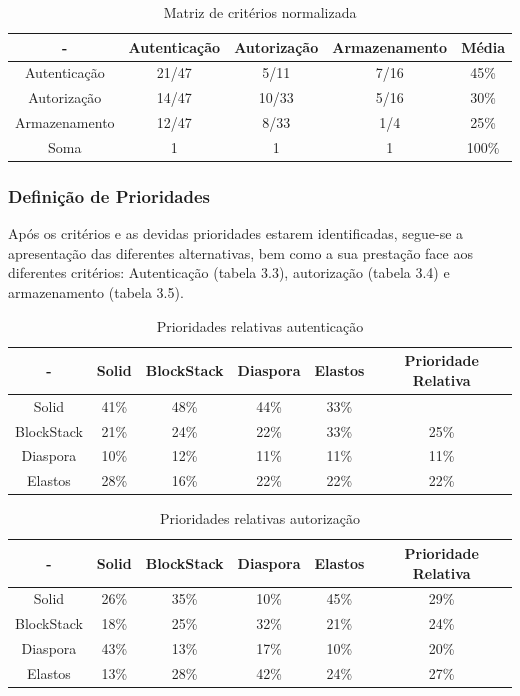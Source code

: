 \begin{table}[h]
\centering
\caption{Matriz de critérios normalizada}
\label{table_matriz_criterios_normalizada}
\vspace{0.5cm}
\begin{tabular}{c|c|c|c|c}
\centering
 - & Autenticação & Autorização & Armazenamento & Média \\
\hline                               
Autenticação & 21/47 & 5/11 & 7/16 & 45\% \\
Autorização &  14/47 & 10/33 & 5/16 & 30\% \\
Armazenamento &  12/47 &  8/33 & 1/4 & 25\% \\
Soma & 1 & 1 & 1 & 100\% \\
\end{tabular}
\end{table}

\pagebreak

\subsubsection{Definição de Prioridades}
Após os critérios e as devidas prioridades estarem identificadas, segue-se a apresentação das diferentes alternativas, bem como a sua prestação face aos diferentes critérios: Autenticação (tabela 3.3), autorização (tabela 3.4) e armazenamento (tabela 3.5). 

\begin{table}[H]
\centering
\caption{Prioridades relativas autenticação}
\vspace{0.5cm}
\begin{tabular}{c|c|c|c|c|c} 
 - & Solid & BlockStack & Diaspora & Elastos & Prioridade Relativa \\
\hline                               
Solid & 41\% &	48\% &	44\% & 33\% \\
BlockStack &  21\% & 24\% &	22\% &	33\% &	25\% \\
Diaspora &  10\% &	12\% &	11\% & 11\%	& 11\% \\
Elastos & 28\% & 16\% & 22\% & 22\% & 22\% \\
\end{tabular}
\end{table}

\begin{table}[H]
\centering
\caption{Prioridades relativas autorização}
\vspace{0.5cm}
\begin{tabular}{c|c|c|c|c|c} 
 - & Solid & BlockStack & Diaspora & Elastos & Prioridade Relativa \\
\hline                               
Solid & 26\% &	35\% &	10\% & 45\% & 29\% \\
BlockStack &  18\% & 25\% & 32\% & 21\% & 24\% \\
Diaspora &  43\% &	13\% &	17\% &	10\% & 20\% \\
Elastos & 13\% & 28\% &	42\% & 24\% & 27\% \\
\end{tabular}
\end{table}


